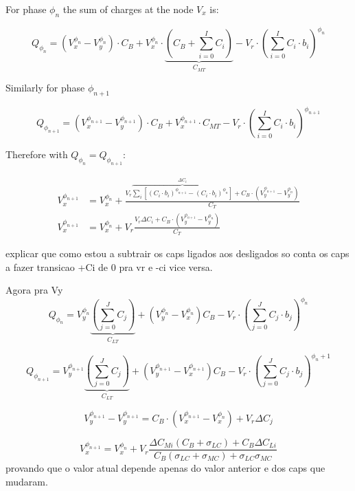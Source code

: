 For phase $\phi_n$ the sum of charges at the node $V_x$ is:

\begin{equation}
    Q_{\phi_n} = (V_x^{\phi_n}-V_y^{\phi_n})\cdot C_B + V_x^{\phi_n}\cdot \underbrace{ \left ( C_B + \sum_{i=0}^{I}C_i \right )}_{C_{MT}}-V_r\cdot \left ( \sum_{i=0}^{I} C_i\cdot b_i \right )^{\phi_n}
\end{equation}

Similarly for phase $\phi_{n+1}$

\begin{equation}
    Q_{\phi_{n+1}} = (V_x^{\phi_{n+1}}-V_y^{\phi_{n+1}})\cdot C_B + V_x^{\phi_{n+1}}\cdot C_{MT}-V_r\cdot \left ( \sum_{i=0}^{I} C_i\cdot b_i \right )^{\phi_{n+1}}
\end{equation}

Therefore with $Q_{\phi_{n}}=Q_{\phi_{n+1}}$:

\begin{equation}
    \begin{split}
        V_x^{\phi_{n+1}} &= V_x^{\phi_{n}} +  \frac{ V_r\overbrace{\sum_{i}\left[ (C_i\cdot b_i)^{\phi_{n+1}} - (C_i\cdot b_i)^{\phi_{n}}\right]}^{\Delta C_i}+C_B\cdot \left(V_y^{\phi_{n+1}}-V_y^{\phi_{n}}\right)}{C_T} \\
        V_x^{\phi_{n+1}} &= V_x^{\phi_{n}} + V_r \frac{ V_r \Delta C_i +C_B\cdot \left(V_y^{\phi_{n+1}}-V_y^{\phi_{n}}\right)}{C_T}
    \end{split}
    \label{eq:VxPn}
\end{equation}

explicar que como estou a subtrair os caps ligados aos desligados so conta os caps a fazer transicao +Ci de 0 pra vr e -ci vice versa.

Agora pra Vy 
\begin{equation}
    Q_{\phi_{n}} = V_y^{\phi_n}\underbrace{\left( \sum_{j=0}^{J}C_j \right)}_{C_{LT}} + (V_y^{\phi_{n}}-V_x^{\phi_{n}})C_B-V_r\cdot \left ( \sum_{j=0}^{J} C_j\cdot b_j \right )^{\phi_n}
\end{equation}

\begin{equation}
    Q_{\phi_{n+1}} = V_y^{\phi_{n+1}}\underbrace{\left( \sum_{j=0}^{J}C_j \right)}_{C_{LT}} + (V_y^{\phi_{n+1}}-V_x^{\phi_{n+1}})C_B-V_r\cdot \left ( \sum_{j=0}^{J} C_j\cdot b_j \right )^{\phi_n+1}
\end{equation}

\begin{equation}
    V_y^{\phi_{n+1}}-V_y^{\phi_{n+1}} = C_B\cdot (V_x^{\phi_{n+1}}-V_x^{\phi_n}) + V_r\Delta C_j
\end{equation}

\begin{equation}
    \boxed{V_{x}^{\phi_{n+1}}=V_{x}^{\phi_n}+V_{r}\frac{   {\Delta}C_{Mi} (C_{B} + \sigma_{LC} )+C_{B} {\Delta}C_{Li}}{C_{B}\left( \sigma_{LC} + \sigma_{MC}\right) + \sigma_{LC} \sigma_{MC}}}
\end{equation}
provando que o valor atual depende apenas do valor anterior e dos caps que mudaram.

